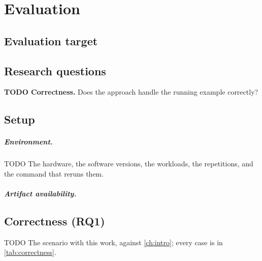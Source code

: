\chapter{Evaluation}\label{ch:evaluation}

\section{Evaluation target}\label{sec:eval-target}

\section{Research questions}
\begin{rqlist}
  \item\label{rq:correct} \textbf{TODO Correctness.} Does the approach handle the running example correctly?
\end{rqlist}

\section{Setup}\label{sec:setup}

\paragraph{Environment.}
TODO The hardware, the software versions, the workloads, the repetitions, and the command that reruns them.

\paragraph{Artifact availability.}

\section{Correctness (RQ1)}
\begin{runningexample}[solved]
TODO The scenario with this work, against \cref{ch:intro}; every case is in \cref{tab:correctness}.
\end{runningexample}


